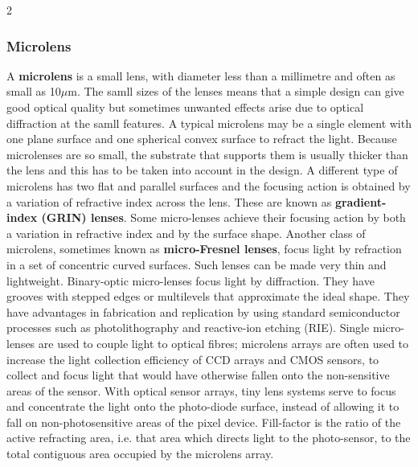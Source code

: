\documentclass[10pt]{article}
\begin{document}
\begin{multicols}{2}
\subsubsection{Microlens}
A \textbf{microlens} is a small lens, with diameter less than a millimetre and often as small as 10$\mu$m. The samll sizes of the lenses means that a simple design can give good optical quality but sometimes unwanted effects arise due to optical diffraction at the samll features. A typical microlens may be a single element with one plane surface and one spherical convex surface to refract the light.
Because microlenses are so small, the substrate that supports them is usually thicker than the lens and this has to be taken into account in the design.
\newline \newline
A different type of microlens has two flat and parallel surfaces and the focusing action is obtained by a variation of refractive index across the lens. These are known as \textbf{gradient-index (GRIN) lenses}. Some micro-lenses achieve their focusing action by both a variation in refractive index and by the surface shape.
\newline \newline
Another class of microlens, sometimes known as \textbf{micro-Fresnel lenses}, focus light by refraction in a set of concentric curved surfaces. Such lenses can be made very thin and lightweight. Binary-optic micro-lenses focus light by diffraction. They have grooves with stepped edges or multilevels that approximate the ideal shape. They have advantages in fabrication and replication by using standard semiconductor processes such as photolithography and reactive-ion etching (RIE).
\newline \newline
Single micro-lenses are used to couple light to optical fibres; microlens arrays are often used to increase the light collection efficiency of CCD arrays and CMOS sensors, to collect and focus light that would have otherwise fallen onto the non-sensitive areas of the sensor.
\newline \newline
With optical sensor arrays, tiny lens systems serve to focus and concentrate the light onto the photo-diode surface, instead of allowing it to fall on non-photosensitive areas of the pixel device. Fill-factor is the ratio of the active refracting area, i.e. that area which directs light to the photo-sensor, to the total contiguous area occupied by the microlens array.


\end{multicols}
\end{document}
